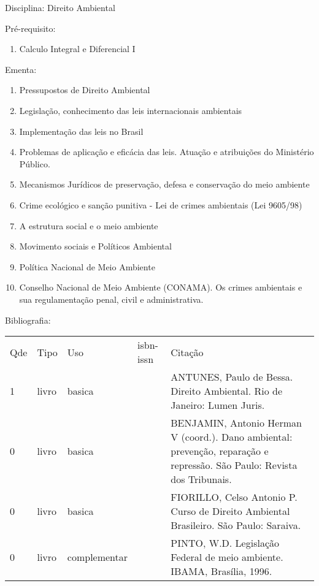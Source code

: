 \documentclass[12pt,a4paper,twoside]{report}
\begin{document}
Disciplina: Direito Ambiental

Pré-requisito:
\begin{enumerate}
\item Calculo Integral e Diferencial I
\end{enumerate}

Ementa:
\begin{enumerate}
\item Pressupostos de Direito Ambiental
\item Legislação, conhecimento das leis internacionais ambientais
\item Implementação das leis no Brasil
\item Problemas de aplicação e eficácia das leis. Atuação e atribuições do Ministério Público.
\item Mecanismos Jurídicos de preservação, defesa e conservação do meio ambiente
\item Crime ecológico e sanção punitiva - Lei de crimes ambientais (Lei 9605/98)
\item A estrutura social e o meio ambiente
\item Movimento sociais e Políticos Ambiental
\item Política Nacional de Meio Ambiente
\item Conselho Nacional de Meio Ambiente (CONAMA). Os crimes ambientais e sua regulamentação penal, civil e administrativa.
\end{enumerate}

Bibliografia:
\begin{tabular}{lllll}
Qde & Tipo & Uso & isbn-issn & Citação \\
1&livro&basica&&ANTUNES, Paulo de Bessa. Direito Ambiental. Rio de Janeiro: Lumen Juris.\\
0&livro&basica&&BENJAMIN, Antonio Herman V (coord.). Dano ambiental: prevenção, reparação e repressão. São Paulo: Revista dos Tribunais.\\
0&livro&basica&&FIORILLO, Celso Antonio P. Curso de Direito Ambiental Brasileiro. São Paulo: Saraiva.\\
0&livro&complementar&&PINTO, W.D. Legislação Federal de meio ambiente. IBAMA, Brasília, 1996.\\
\end{tabular}
\end{document}
